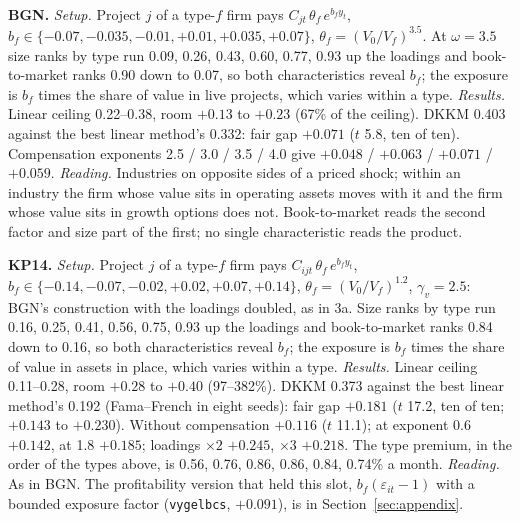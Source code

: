 \documentclass[11pt]{article}
\begin{document}
\noindent\textbf{BGN.} \emph{Setup.} Project $j$ of a type-$f$ firm pays $C_{jt}\,\theta_f\,e^{b_f y_t}$, $b_f \in \{-0.07, -0.035, -0.01, +0.01, +0.035, +0.07\}$, $\theta_f = (V_0/V_f)^{3.5}$. At $\omega = 3.5$ size ranks by type run 0.09, 0.26, 0.43, 0.60, 0.77, 0.93 up the loadings and book-to-market ranks 0.90 down to 0.07, so both characteristics reveal $b_f$; the exposure is $b_f$ times the share of value in live projects, which varies within a type. \emph{Results.} Linear ceiling 0.22--0.38, room $+0.13$ to $+0.23$ (67\% of the ceiling). DKKM 0.403 against the best linear method's 0.332: fair gap $+0.071$ ($t$ 5.8, ten of ten). Compensation exponents 2.5 / 3.0 / 3.5 / 4.0 give $+0.048$ / $+0.063$ / $+0.071$ / $+0.059$. \emph{Reading.} Industries on opposite sides of a priced shock; within an industry the firm whose value sits in operating assets moves with it and the firm whose value sits in growth options does not. Book-to-market reads the second factor and size part of the first; no single characteristic reads the product.

\noindent\textbf{KP14.} \emph{Setup.} Project $j$ of a type-$f$ firm pays $C_{ijt}\,\theta_f\,e^{b_f y_t}$, $b_f \in \{-0.14, -0.07, -0.02, +0.02, +0.07, +0.14\}$, $\theta_f = (V_0/V_f)^{1.2}$, $\gamma_v = 2.5$: BGN's construction with the loadings doubled, as in 3a. Size ranks by type run 0.16, 0.25, 0.41, 0.56, 0.75, 0.93 up the loadings and book-to-market ranks 0.84 down to 0.16, so both characteristics reveal $b_f$; the exposure is $b_f$ times the share of value in assets in place, which varies within a type. \emph{Results.} Linear ceiling 0.11--0.28, room $+0.28$ to $+0.40$ (97--382\%). DKKM 0.373 against the best linear method's 0.192 (Fama--French in eight seeds): fair gap $+0.181$ ($t$ 17.2, ten of ten; $+0.143$ to $+0.230$). Without compensation $+0.116$ ($t$ 11.1); at exponent 0.6 $+0.142$, at 1.8 $+0.185$; loadings $\times2$ $+0.245$, $\times3$ $+0.218$. The type premium, in the order of the types above, is 0.56, 0.76, 0.86, 0.86, 0.84, 0.74\% a month. \emph{Reading.} As in BGN. The profitability version that held this slot, $b_f(\varepsilon_{it} - 1)$ with a bounded exposure factor (\texttt{vygelbcs}, $+0.091$), is in Section~\ref{sec:appendix}.
\end{document}
